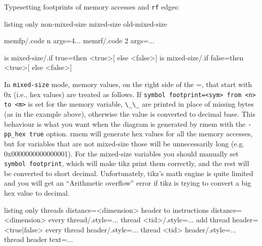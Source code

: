 \documentclass[a4paper]{article}
\begin{document}
Typesetting footprints of memory accesses and \texttt{rf} edges:
\begin{tcblisting}{listing only}
non-mixed-size  %
mixed-size      %
old-mixed-size  %

memfp/.code n args={4}{...} %
memrf/.code 2 args={...} %

is mixed-size/.if true=then {<true>}[ else {<false>}]
is mixed-size/.if false=then {<true>}[ else {<false>}]
\end{tcblisting}
In \lstinline+mixed-size+ mode, memory values, on the right side of the =, that
start with 0x (i.e., hex values) are treated as follows.
If \lstinline+symbol footprint=<sym> from <n> to <m>+ is set for the memory
variable, \lstinline+\_\_+ are printed in place of missing bytes (as in the
example above), otherwise the value is converted to decimal base.
This behaviour is what you want when the diagram is generated by rmem with the
\texttt{-pp\_hex true} option.
rmem will generate hex values for all the memory accesses, but for variables
that are not mixed-size those will be unnecessarily long (e.g. 0x0000000000000001).
For the mixed-size variables you should manually set \lstinline+symbol footprint+,
which will make tikz print them correctly, and the rest will be converted to
short decimal.
Unfortunately, tikz's math engine is quite limited and you will get an
``Arithmetic overflow'' error if tikz is trying to convert a big hex value to
decimal.

\begin{tcblisting}{listing only}
threads distance=<dimension> %
header to instructions distance=<dimension> %
every thread/.style={...} %
thread <tid>/.style={...}
add thread header=<true|false> %
every thread header/.style={...} %
thread <tid> header/.style={...}
thread header text={...} %
\end{tcblisting}
\end{document}
